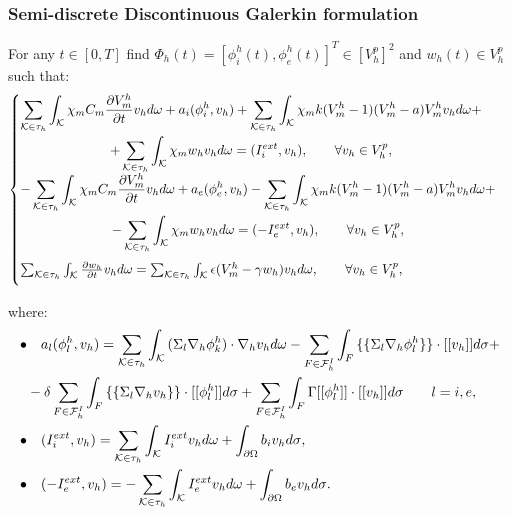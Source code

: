 \documentclass[9pt]{beamer}
\begin{document}
\begin{frame}
	\frametitle{Semi-discrete Discontinuous Galerkin formulation}
	For any $t\in[0,T]$ find $\Phi_h(t)=[\phi_i^h(t),\phi_e^h(t)]^T \in [V_h^p]^2$  and  $w_h(t) \in V_h^p$ such that:
	\vspace{2mm}
	\begin{equation*}
	\begin{cases}
	\begin{gathered}
	\sum_{\mathcal{K} \in \tau_h} \int_{\mathcal{K}}{ \chi_m C_m \pdv{V_m^h}{t} v_h d\omega}+a_i(\phi_i^h,v_h)+\sum_{\mathcal{K} \in \tau_h} \int_{\mathcal{K}}{ \chi_m k (V_m^h-1)(V_m^h-a) V_m^h v_h d\omega}+\\
	+\sum_{\mathcal{K} \in \tau_h} \int_{\mathcal{K}}{ \chi_m w_h v_h d\omega}=(I_i^{ext},v_h), \qquad \forall v_h \in V_h^p,\\
	\end{gathered}\\
	\vspace{2mm}
	\begin{gathered}
	-\sum_{\mathcal{K} \in \tau_h} \int_{\mathcal{K}}{ \chi_m C_m \pdv{V_m^h}{t} v_h d\omega}+a_e(\phi_e^h,v_h)-\sum_{\mathcal{K} \in \tau_h} \int_{\mathcal{K}}{ \chi_m k (V_m^h-1)(V_m^h-a) V_m^h v_h d\omega}+\\
	-\sum_{\mathcal{K} \in \tau_h} \int_{\mathcal{K}}{ \chi_m w_h v_h d\omega}=(-I_e^{ext},v_h), \qquad \forall v_h \in V_h^p,\\
	\end{gathered}\\
	\vspace{2mm}
	\sum_{\mathcal{K} \in \tau_h} \int_{\mathcal{K}}{\pdv{w_h}{t}v_h d\omega}=\sum_{\mathcal{K} \in \tau_h} \int_{\mathcal{K}}{\epsilon (V_m^h-\gamma w_h) v_h d\omega}, \qquad \forall v_h \in V_h^p,\\
	\end{cases}
	\end{equation*}
\end{frame}
\begin{frame}
	where:
	\center
	\begin{equation*}
	\begin{aligned}
	\bullet& \quad a_l(\phi_l^h,v_h)=\sum_{\mathcal{K} \in \tau_h} \int_{\mathcal{K}}{(\Sigma_l \nabla_h \phi_k^h) \cdot \nabla_h v_h d\omega}-\sum_{F \in \mathcal{F}_h^I} \int_F { \{\{\Sigma_l \nabla_h \phi_l^h \}\} \cdot [[v_h]] d\sigma}+\\
	&-\delta \sum_{F \in \mathcal{F}_h^I} \int_F{ \{\{\Sigma_l \nabla_h v_h\}\} \cdot [[\phi_l^h]]d\sigma}+\sum_{F \in \mathcal{F}_h^I}\int_F {\Gamma [[\phi_l^h]] \cdot [[v_h]] d\sigma} \qquad l=i,e,\\
	\newline
	\bullet& \quad (I_i^{ext},v_h)=\sum_{\mathcal{K} \in \tau_h} \int_{\mathcal{K}} {I_i^{ext} v_h d\omega}+\int_{\partial \Omega}{b_i v_h d\sigma},\\
	\newline
	\bullet& \quad (-I_e^{ext},v_h)=-\sum_{\mathcal{K} \in \tau_h} \int_{\mathcal{K}} {I_e^{ext} v_h d\omega}+\int_{\partial \Omega}{b_e v_h d\sigma}.
	\end{aligned}
	\end{equation*}
\end{frame}
\end{document}
